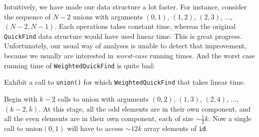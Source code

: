 \documentclass{tstextbook}
\begin{document}
Intuitively, we have made our data structure a lot faster.
For instance, consider the sequence of $N-2$ unions with arguments $(0,1)$, $(1,2)$, $(2,3)$, $\ldots$, $(N-2,N-1)$.
Each operations takes constant time, whereas the original {\tt QuickFind} data structure would have used linear time.
This is great progress.
Unfortunately, our usual way of analyses is unable to detect that improvement, because we usually are interested in \emph{worst-case} running times.
And the worst case running time of {\tt WeightedQuickFind} is quite bad:

\begin{ExerciseList}
  \Exercise{}\label{ex: quick-find worst case}
  Exhibit a call to {\tt union()} for which {\tt WeightedQuickFind} that takes linear time.

  \Answer{} Begin with $k-2$ calls to union with arguments $(0,2)$, $(1,3)$, $(2,4)$, $\ldots$, $(k-2, k)$.
  At this stage, all the odd elements are in their own component, and all the even elements are in their own component, each of size $\sim \frac12 k$.
  Now a single call to union$(0,1)$ will have to access $\sim12 k$ array elements of \texttt{id}.
\end{ExerciseList}
\end{document}
